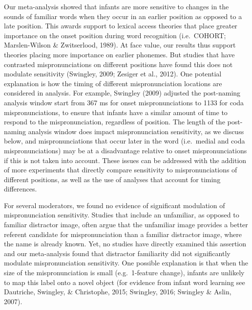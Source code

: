 \documentclass[
  english,
  man, noextraspace]{apa6}
\begin{document}
Our meta-analysis showed that infants are more sensitive to changes in the sounds of familiar words when they occur in an earlier position as opposed to a late position. This awards support to lexical access theories that place greater importance on the onset position during word recognition (i.e.~COHORT; Marslen-Wilson \& Zwitserlood, 1989). At face value, our results thus support theories placing more importance on earlier phonemes. But studies that have contrasted mispronunciations on different positions have found this does not modulate sensitivity (Swingley, 2009; Zesiger et al., 2012). One potential explanation is how the timing of different mispronunciation locations are considered in analysis. For example, Swingley (2009) adjusted the post-naming analysis window start from 367 ms for onset mispronunciations to 1133 for coda mispronunciations, to ensure that infants have a similar amount of time to respond to the mispronunciation, regardless of position. The length of the post-naming analysis window does impact mispronunciation sensitivity, as we discuss below, and mispronunciations that occur later in the word (i.e.~medial and coda mispronunciations) may be at a disadvantage relative to onset mispronunciations if this is not taken into account. These issues can be addressed with the addition of more experiments that directly compare sensitivity to mispronunciations of different positions, as well as the use of analyses that account for timing differences.

For several moderators, we found no evidence of significant modulation of mispronunciation sensitivity. Studies that include an unfamiliar, as opposed to familiar distractor image, often argue that the unfamiliar image provides a better referent candidate for mispronunciation than a familiar distractor image, where the name is already known. Yet, no studies have directly examined this assertion and our meta-analysis found that distractor familiarity did not significantly modulate mispronunciation sensitivity. One possible explanation is that when the size of the mispronunciation is small (e.g.~1-feature change), infants are unlikely to map this label onto a novel object (for evidence from infant word learning see Dautriche, Swingley, \& Christophe, 2015; Swingley, 2016; Swingley \& Aslin, 2007).
\end{document}
